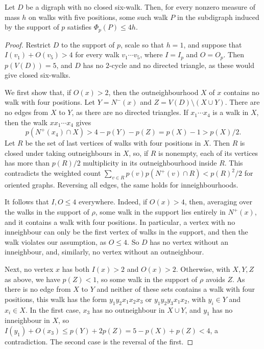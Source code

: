 \begin{lemma}\label{c6:lem:no6}
Let $D$ be a digraph with no closed six-walk. Then, for every nonzero measure of mass $h$ on
walks with five positions, some such walk $P$ in the subdigraph induced by the support of $p$ satisfies $\Phi_p(P)\le4h$.
\end{lemma}
\begin{proof}
Restrict $D$ to the support of $p$, scale so that $h=1$, and suppose that
$I(v_1)+O(v_5)>4$ for every walk $v_1\cdots v_5$, where $I=I_p$ and $O=O_p$. Then $p(V(D))=5$,
and $D$ has no $2$-cycle and no directed triangle, as these would give closed six-walks.

We first show that, if $O(x)>2$, then the outneighbourhood $X$ of $x$ contains no walk with four positions.
Let $Y=N^-(x)$ and $Z=V(D)\setminus(X\cup Y)$. There are no edges from $X$ to $Y$, as there are no directed triangles. If $x_1\cdots x_4$ is a walk in $X$, then the walk $xx_1\cdots x_4$ gives
\[
 p(N^+(x_4)\cap X)>4-p(Y)-p(Z)=p(X)-1>p(X)/2.
\]
Let $R$ be the set of last vertices of walks with four positions in $X$. Then $R$ is closed under taking outneighbours in $X$, so, if $R$ is nonempty, each of its vertices has more than $p(R)/2$ multiplicity in its outneighbourhood inside $R$. This contradicts the weighted count
$\sum_{v\in R}p(v)p(N^+(v)\cap R)<p(R)^2/2$ for oriented graphs. Reversing all edges, the same holds for inneighbourhoods.

It follows that $I,O\le4$ everywhere. Indeed, if $O(x)>4$, then, averaging over the walks in the support of $\rho$, some walk in the support lies entirely in $N^+(x)$, and it contains a walk with four positions.
In particular, a vertex with no inneighbour can only be the first vertex of walks in the support, and then the walk violates our assumption, as $O\le4$. So $D$ has no vertex without an inneighbour, and, similarly, no vertex without an outneighbour.

Next, no vertex $x$ has both $I(x)>2$ and $O(x)>2$. Otherwise, with $X,Y,Z$ as above, we have $p(Z)<1$, so some walk in the support of $\rho$ avoids $Z$.
As there is no edge from $X$ to $Y$ and neither of these sets contains a walk with four positions, this walk has the form $y_1y_2x_1x_2x_3$ or $y_1y_2y_3x_1x_2$, with $y_i\in Y$ and $x_i\in X$.
In the first case, $x_3$ has no outneighbour in $X\cup Y$, and $y_1$ has no inneighbour in $X$, so
$I(y_1)+O(x_3)\le p(Y)+2p(Z)=5-p(X)+p(Z)<4$, a contradiction. The second case is the reversal of the first.


\end{proof}
